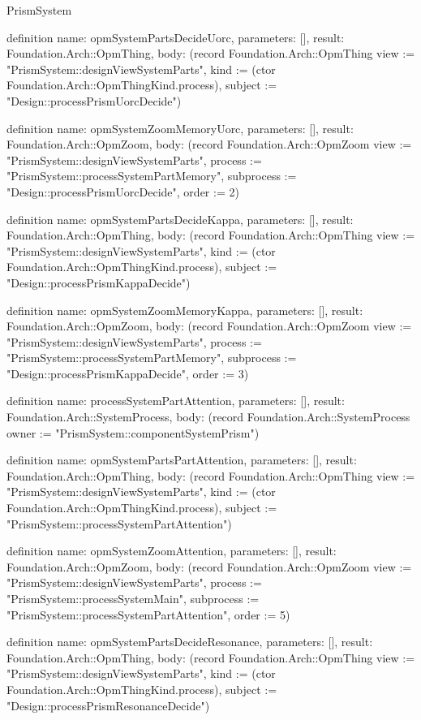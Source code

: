 \begin{lexlean}{PrismSystem}
\begin{semanticmodule}
definition{
  name: opmSystemPartsDecideUorc,
  parameters: [],
  result: Foundation.Arch::OpmThing,
  body: (record Foundation.Arch::OpmThing {view := "PrismSystem::designViewSystemParts", kind := (ctor Foundation.Arch::OpmThingKind.process), subject := "Design::processPrismUorcDecide"})
}

definition{
  name: opmSystemZoomMemoryUorc,
  parameters: [],
  result: Foundation.Arch::OpmZoom,
  body: (record Foundation.Arch::OpmZoom {view := "PrismSystem::designViewSystemParts", process := "PrismSystem::processSystemPartMemory", subprocess := "Design::processPrismUorcDecide", order := 2})
}

definition{
  name: opmSystemPartsDecideKappa,
  parameters: [],
  result: Foundation.Arch::OpmThing,
  body: (record Foundation.Arch::OpmThing {view := "PrismSystem::designViewSystemParts", kind := (ctor Foundation.Arch::OpmThingKind.process), subject := "Design::processPrismKappaDecide"})
}

definition{
  name: opmSystemZoomMemoryKappa,
  parameters: [],
  result: Foundation.Arch::OpmZoom,
  body: (record Foundation.Arch::OpmZoom {view := "PrismSystem::designViewSystemParts", process := "PrismSystem::processSystemPartMemory", subprocess := "Design::processPrismKappaDecide", order := 3})
}

definition{
  name: processSystemPartAttention,
  parameters: [],
  result: Foundation.Arch::SystemProcess,
  body: (record Foundation.Arch::SystemProcess {owner := "PrismSystem::componentSystemPrism"})
}

definition{
  name: opmSystemPartsPartAttention,
  parameters: [],
  result: Foundation.Arch::OpmThing,
  body: (record Foundation.Arch::OpmThing {view := "PrismSystem::designViewSystemParts", kind := (ctor Foundation.Arch::OpmThingKind.process), subject := "PrismSystem::processSystemPartAttention"})
}

definition{
  name: opmSystemZoomAttention,
  parameters: [],
  result: Foundation.Arch::OpmZoom,
  body: (record Foundation.Arch::OpmZoom {view := "PrismSystem::designViewSystemParts", process := "PrismSystem::processSystemMain", subprocess := "PrismSystem::processSystemPartAttention", order := 5})
}

definition{
  name: opmSystemPartsDecideResonance,
  parameters: [],
  result: Foundation.Arch::OpmThing,
  body: (record Foundation.Arch::OpmThing {view := "PrismSystem::designViewSystemParts", kind := (ctor Foundation.Arch::OpmThingKind.process), subject := "Design::processPrismResonanceDecide"})
}


\end{semanticmodule}
\end{lexlean}

